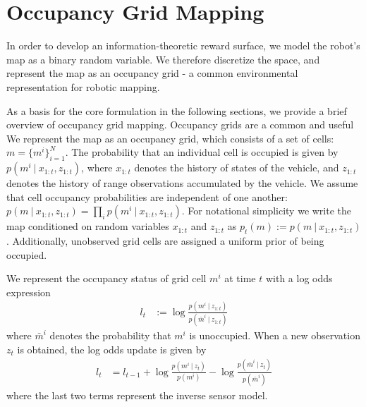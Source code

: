 \section{Occupancy Grid Mapping}
\label{sec:occupancy_grid_mapping}

In order to develop an information-theoretic reward surface, we model the
robot's map as a binary random variable. We therefore discretize the space, and
represent the map as an occupancy grid - a common environmental representation
for robotic mapping.

As a basis for the core formulation in the following sections, we provide a brief overview of occupancy grid mapping. Occupancy grids are a common and useful
We represent the map as an occupancy grid, which consists of a set of cells: $m = \{m^{i}\}_{i=1}^{N}$.
The probability that an individual cell is occupied is given by $p\left(m^{i} \ \vert \ x_{1:t}, z_{1:t}\right)$, where $x_{1:t}$ denotes the history of states of the vehicle, and $z_{1:t}$ denotes the history of range observations accumulated by the vehicle.
We assume that cell occupancy probabilities are independent of one another: $p\left(m \ \vert \ x_{1:t}, z_{1:t}\right) = \prod_{i} p\left(m^{i} \ \vert \ x_{1:t}, z_{1:t}\right)$.
For notational simplicity we write the map conditioned on random variables $x_{1:t}$ and $z_{1:t}$ as $p_{t}\left(m\right) := p\left(m \ \vert \ x_{1:t}, z_{1:t}\right)$.
Additionally, unobserved grid cells are assigned a uniform prior of being occupied.

We represent the occupancy status of grid cell $m^i$ at time $t$ with a log odds expression
\begin{align}
  l_t &:= \log \frac{p \left( m^i \ \vert \ z_{1:t} \right)}{p \left( \bar{m}^i \ \vert \ z_{1:t} \right)}
\end{align}
where $\bar{m}^i$ denotes the probability that $m^i$ is unoccupied.
When a new observation $z_t$ is obtained, the log odds update is given by
\begin{align}
  l_t &= l_{t-1} + \log \frac{p\left( m^i \ \vert \ z_t \right)}{p \left( m^i \right)} - \log \frac{p\left( \bar{m}^i \ \vert \ z_t \right)}{p \left(\bar{m}^i \right)}
  \label{eq:logodds_update}
\end{align}
where the last two terms represent the inverse sensor model.
